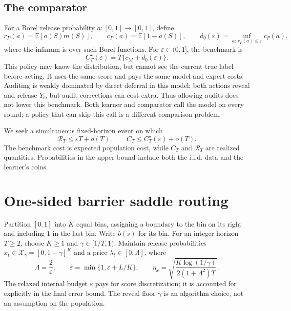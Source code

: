 \documentclass[11pt]{article}
\theoremstyle{remark}
\newcommand{\E}{\mathbb E}
\newcommand{\calR}{\mathcal R}
\newcommand{\eps}{\varepsilon}
\begin{document}
\subsection{The comparator}

For a Borel release probability $a:[0,1]\to[0,1]$, define
\begin{equation}
 r_P(a)=\E[a(S)m(S)],\qquad
 c_P(a)=\E[1-a(S)],\qquad
 d_0(\eps)=\inf_{a:\,r_P(a)\le\eps}c_P(a),
 \label{eq:population}
\end{equation}
where the infimum is over such Borel functions. For $\eps\in(0,1]$,
the benchmark is
\begin{equation}
 C_T^\star(\eps)=T\{c_M+d_0(\eps)\}.
 \label{eq:population-benchmark}
\end{equation}
This policy may know the distribution, but cannot see the current true
label before acting. It uses the same score and pays the same model and
expert costs. Auditing is weakly dominated by direct deferral in this
model: both actions reveal and release $Y_t$, but audit corrections can
cost extra. Thus allowing audits does not lower this benchmark. Both
learner and comparator call the model on every round; a policy that can
skip this call is a different comparison problem.

We seek a simultaneous fixed-horizon event on which
\begin{equation}
 \calR_T\le\eps T+o(T),\qquad
 C_T\le C_T^\star(\eps)+o(T).
 \label{eq:target}
\end{equation}
The benchmark cost is expected population cost, while $C_T$ and
$\calR_T$ are realized quantities. Probabilities in the upper bound
include both the i.i.d. data and the learner's coins.

\section{One-sided barrier saddle routing}
\label{sec:algorithm}

Partition $[0,1]$ into $K$ equal bins, assigning a boundary to the bin on
its right and including $1$ in the last bin. Write $b(s)$ for its bin.
For an integer horizon $T\ge2$, choose $K\ge1$ and
$\gamma\in[1/T,1)$. Maintain release probabilities
$x_t\in\mathcal X_\gamma=[0,1-\gamma]^K$ and a price
$\lambda_t\in[0,\Lambda]$, where
\begin{equation}
 \Lambda=\frac2\eps,\qquad
 \bar\eps=\min\{1,\eps+L/K\},\qquad
 \eta_x=\sqrt{\frac{K\log(1/\gamma)}{2(1+\Lambda^2)T}}.
 \label{eq:tuning}
\end{equation}
The relaxed internal budget $\bar\eps$ pays for score discretization;
it is accounted for explicitly in the final error bound. The reveal floor
$\gamma$ is an algorithm choice, not an assumption on the population.
\end{document}
